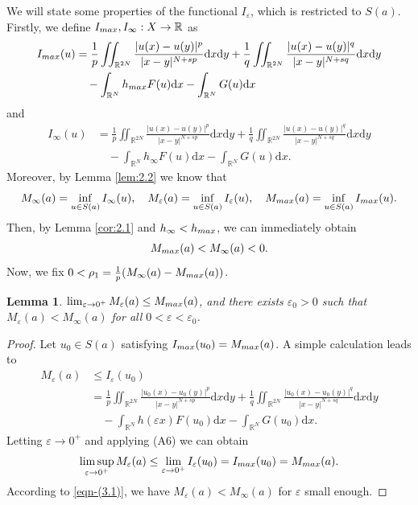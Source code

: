\documentclass[10pt,a4paper]{amsart}
\numberwithin{equation}{section}
\newtheorem{lemma}[theorem]{Lemma}
\begin{document}
We will state some properties of the functional $I_{\varepsilon}$,
which is restricted to $S(a)$.
Firstly, we define $I_{\rm max},I_\infty:X\to \mathbb{R}$ as
\begin{align*}
I_{\rm max}(u)
&= \frac{1}{p}\iint_{\mathbb{R}^{2N}}\frac{|u(x)
 -u(y)|^{p}}{|x-y|^{N+sp}}\mathrm{d}x\mathrm{d}y
  +\frac{1}{q}\iint_{\mathbb{R}^{2N}}\frac{|u(x)-u(y)|^{q}}{|x-y|^{N+sq}}\mathrm{d}x\mathrm{d}y\\
&\quad -\int_{\mathbb{R}^N}h_{\rm max}F(u)\mathrm{d}x
 -\int_{\mathbb{R}^N}G(u)\mathrm{d}x
\end{align*}
and
\begin{align*}
I_\infty(u)
&= \frac{1}{p}\iint_{\mathbb{R}^{2N}}\frac{|u(x)-u(y)|^{p}}
 {|x-y|^{N+sp}}\mathrm{d}x\mathrm{d}y+\frac{1}{q}
 \iint_{\mathbb{R}^{2N}}\frac{|u(x)-u(y)|^{q}}{|x-y|^{N+sq}}\mathrm{d}x\mathrm{d}y\\
&\quad -\int_{\mathbb{R}^N}h_{\infty}F(u)\mathrm{d}x
-\int_{\mathbb{R}^N}G(u)\mathrm{d}x.
\end{align*}
Moreover, by Lemma \ref{lem:2.2} we know that
$$ 
M_\infty(a)=\inf_{u\in S(a)}I_\infty(u),\quad
M_\varepsilon(a)=\inf_{u\in S(a)}I_\varepsilon(u),\quad
M_{\rm max}(a)=\inf_{u\in S(a)}I_{\rm max}(u).
$$
Then, by Lemma \ref{cor:2.1} and $h_\infty<h_{\rm max}$, we can immediately obtain
\begin{equation}\label{eqn-(3.1)}
M_{\rm max}(a)<M_\infty(a)<0.
\end{equation}
Now, we fix $0<\rho_1=\frac{1}{p}(M_\infty(a)-M_{\rm max}(a))$.

\begin{lemma}\label{lem:3.1}
 $\lim_{\varepsilon\to 0^{+}}  M_\varepsilon(a)\le M_{\rm max}(a)$, and there exists 
 $\varepsilon_0>0$ such that $M_\varepsilon(a)<M_\infty(a)$ for all 
 $0<\varepsilon<\varepsilon_0$.
\end{lemma}

\begin{proof} 
Let $u_0\in S(a)$ satisfying $I_{\rm max}(u_0)=M_{\rm max}(a)$.
A simple calculation leads to
\begin{align*}
M_\varepsilon(a)&\leq  I_\varepsilon(u_0)\\
&= \frac{1}{p}\iint_{\mathbb{R}^{2N}}\frac{|u_0(x)-u_0(y)|^{p}}{|x-y|^{N+sp}}
 \mathrm{d}x\mathrm{d}y+\frac{1}{q}\iint_{\mathbb{R}^{2N}}
 \frac{|u_0(x)-u_0(y)|^{q}}{|x-y|^{N+sq}}\mathrm{d}x\mathrm{d}y\\
&\quad -\int_{\mathbb{R}^N}h(\varepsilon x)F(u_0)\mathrm{d}x
 -\int_{\mathbb{R}^N}G(u_0)\mathrm{d}x.
\end{align*}
Letting $\varepsilon\to 0^{+}$ and applying (A6) we can obtain
$$
\limsup\limits_{\varepsilon\to 0^{+}} M_ \varepsilon (a)
\le\lim_{\varepsilon\to 0^{+}}I_\varepsilon(u_0)=I_{\rm max}(u_0)=M_{\rm max}(a).
$$
According to \eqref{eqn-(3.1)}, we have $M_{\varepsilon}(a)<M_{\infty}(a)$ for 
$\varepsilon$ small enough.
\end{proof}
\end{document}

